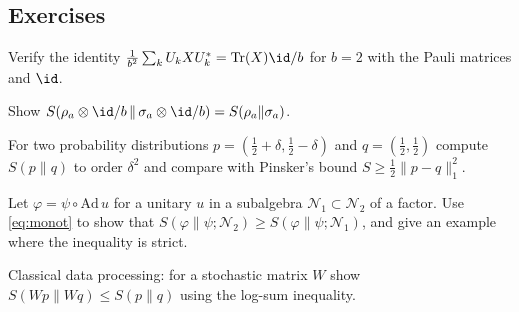 \subsection*{Exercises}
\begin{exercise}\label{ex:monotonic:1}
Verify the identity $\frac1{b^2}\sum_kU_kXU_k^*=\Tr(X)\id/b$ for $b=2$ with the Pauli matrices and $\id$.
\end{exercise}
\begin{exercise}\label{ex:monotonic:2}
Show $S(\rho_a\otimes\id/b\,\|\,\sigma_a\otimes\id/b)=S(\rho_a\|\sigma_a)$.
\end{exercise}
\begin{exercise}\label{ex:monotonic:3}
For two probability distributions $p=(\tfrac12+\delta,\tfrac12-\delta)$ and $q=(\tfrac12,\tfrac12)$ compute $S(p\|q)$ to order $\delta^2$ and compare with Pinsker's bound $S\ge\frac12\|p-q\|_1^2$.
\end{exercise}
\begin{exercise}\label{ex:monotonic:4}
Let $\varphi=\psi\circ\mathrm{Ad}\,u$ for a unitary $u$ in a subalgebra $\mathcal N_1\subset\mathcal N_2$ of a factor. Use \eqref{eq:monot} to show that $S(\varphi\|\psi;\mathcal N_2)\ge S(\varphi\|\psi;\mathcal N_1)$, and give an example where the inequality is strict.
\end{exercise}
\begin{exercise}\label{ex:monotonic:5}
Classical data processing: for a stochastic matrix $W$ show $S(Wp\|Wq)\le S(p\|q)$ using the log-sum inequality.
\end{exercise}

